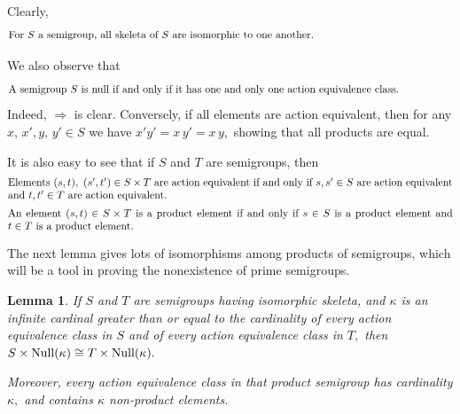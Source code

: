 \documentclass{amsart}
\newtheorem{lemma}[theorem]{Lemma}
\numberwithin{equation}{section}
\numberwithin{theorem}{section}
\begin{document}
Clearly,
%
\begin{equation}\begin{minipage}[c]{35pc}\label{d.skel}
For $S$ a semigroup, all skeleta of $S$ are isomorphic to one another.
\end{minipage}\end{equation}

We also observe that
%
\begin{equation}\begin{minipage}[c]{35pc}\label{d.null_iff}
A semigroup $S$ is null if and only if it has one and only one
action equivalence class.
\end{minipage}\end{equation}
%
Indeed, $\Rightarrow$ is clear.
Conversely, if all elements are action
equivalent, then for any $x,\,x',y,\,y'\in S$ we have
$x'y'=x\,y'=x\,y,$ showing that all products are equal.

It is also easy to see that if $S$ and $T$ are semigroups, then
%
\begin{equation}\begin{minipage}[c]{35pc}\label{d.equiv_in_SxT}
Elements $(s,t),~(s',t')\in S\times T$ are action equivalent
if and only if $s,s'\in S$ are action equivalent and
$t,t'\in T$ are action equivalent.
\end{minipage}\end{equation}
%
\begin{equation}\begin{minipage}[c]{35pc}\label{d.prod_in_SxT}
An element $(s,t)\in S\times T$ is a product element
if and only if $s\in S$ is a product element and
$t\in T$ is a product element.
\end{minipage}\end{equation}

The next lemma gives lots of isomorphisms among products
of semigroups, which will
be a tool in proving the nonexistence of prime semigroups.

\begin{lemma}\label{L.SxNull}
If $S$ and $T$ are semigroups having isomorphic skeleta, and
$\kappa$ is an infinite cardinal greater than or equal
to the cardinality of every action equivalence class in $S$ and of
every action equivalence class in $T,$ then
$S\times\textup{Null}(\kappa) \cong T\times\textup{Null}(\kappa).$

Moreover, every action equivalence class in that product semigroup
has cardinality $\kappa,$ and contains $\kappa$ non-product elements.
\end{lemma}
\end{document}
